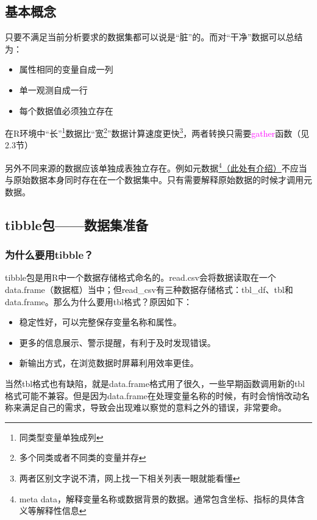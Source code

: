 \documentclass[cn,hazy,blue,14pt,screen]{elegantnote}
\begin{document}
\subsection{基本概念}

只要不满足当前分析要求的数据集都可以说是“脏”的。而对“干净”数据可以总结为：

\begin{itemize}
  \item 属性相同的变量自成一列
  \item 单一观测自成一行
  \item 每个数据值必须独立存在
\end{itemize}

在R环境中“长”\footnote{同类型变量单独成列}数据比“宽\footnote{多个同类或者不同类的变量并存}”数据计算速度更快\footnote{两者区别文字说不清，网上找一下相关列表一眼就能看懂}，两者转换只需要\textcolor{magenta}{gather}函数（见2.3节）

另外不同来源的数据应该单独成表独立存在。例如元数据\footnote{meta data，解释变量名称或数据背景的数据。通常包含坐标、指标的具体含义等解释性信息}\href{http://www.ruanyifeng.com/blog/2007/03/metadata.html}{（此处有介绍）}不应当与原始数据本身同时存在在一个数据集中。只有需要解释原始数据的时候才调用元数据。

\subsection{tibble包——数据集准备}

\subsubsection{为什么要用tibble？}

tibble包是用R中一个数据存储格式命名的。read.csv会将数据读取在一个data.frame（数据框）当中；但read\_csv有三种数据存储格式：tbl\_df、tbl和data.frame。那么为什么要用tbl格式？原因如下：

\begin{itemize}
  \item 稳定性好，可以完整保存变量名称和属性。
  \item 更多的信息展示、警示提醒，有利于及时发现错误。
  \item 新输出方式，在浏览数据时屏幕利用效率更佳。
\end{itemize}

当然tbl格式也有缺陷，就是data.frame格式用了很久，一些早期函数调用新的tbl格式可能不兼容。但是因为data.frame在处理变量名称的时候，有时会悄悄改动名称来满足自己的需求，导致会出现难以察觉的意料之外的错误，非常要命。
\end{document}
